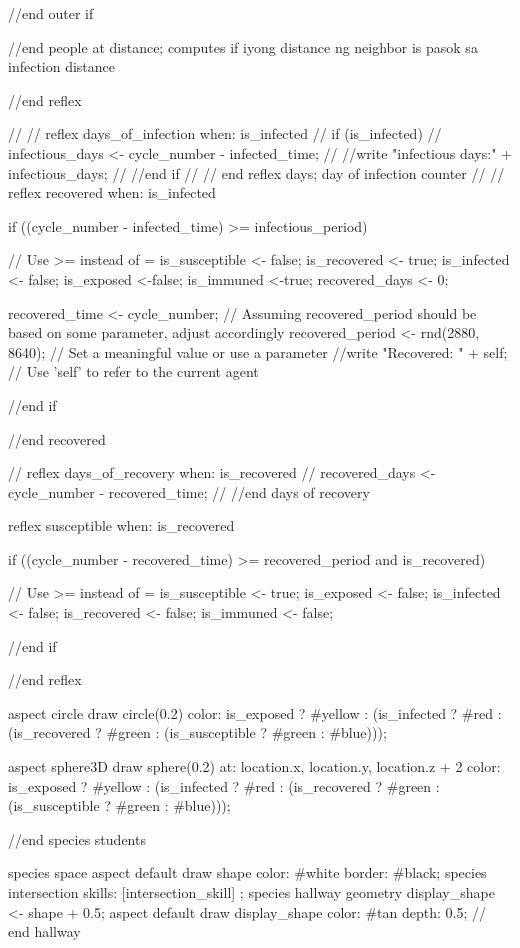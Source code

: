 \begin{verbatimtab}[4]
{{{{{{{					}
					
				}//end outer if	
				}
				
				
			}//end people at distance; computes if iyong distance ng neighbor is pasok sa infection distance 
		} //end reflex
		
//		   
//		reflex days_of_infection when: is_infected {
//			if (is_infected){
//				infectious_days <- cycle_number - infected_time;
//		   		//write "infectious days:" + infectious_days;
//		   	} //end if
//		}// end reflex days; day of infection counter
//	
//	
		reflex recovered when: is_infected {
			if ((cycle_number - infected_time) >= infectious_period) {  // Use >= instead of =
				is_susceptible <- false;
				is_recovered <- true;
				is_infected <- false;
				is_exposed <-false;
				is_immuned <-true;
				recovered_days <- 0;
			        
			     recovered_time <- cycle_number;
				// Assuming recovered_period should be based on some parameter, adjust
				 accordingly
				recovered_period <- rnd(2880, 8640); // Set a meaningful value or use a
				 parameter 
				//write "Recovered: " + self; // Use 'self' to refer to the current agent
			}//end if
		}//end recovered
			
//		reflex days_of_recovery when: is_recovered {
//			recovered_days <- cycle_number -  recovered_time;
//		}//end days of recovery
			
		reflex susceptible when: is_recovered {
			if ((cycle_number - recovered_time) >= recovered_period and is_recovered)
			 {  // Use >= instead of =
				is_susceptible <- true;
				is_exposed <- false;
				is_infected <- false;
				is_recovered <- false;
				is_immuned <- false;
				
			}//end if
		}//end reflex
	
	aspect circle {
		draw circle(0.2) color: is_exposed ? #yellow : (is_infected ? #red : (is_recovered ?
		 #green : (is_susceptible ? #green : #blue)));
	}	
	
		aspect sphere3D {
		draw sphere(0.2) at: {location.x, location.y, location.z + 2} color: is_exposed ?
		 #yellow : (is_infected ? #red : (is_recovered ? #green : (is_susceptible ? #green :
		  #blue)));
	}
		
	}//end species students
	
	species space{
		aspect default{
			draw shape color: #white border: #black;
		}
	}
	species intersection skills: [intersection_skill] ;
	species hallway{
		geometry display_shape <- shape + 0.5;
		aspect default{
			draw display_shape color: #tan depth: 0.5;
		}
	} // end hallway
	
}
\end{verbatimtab}
